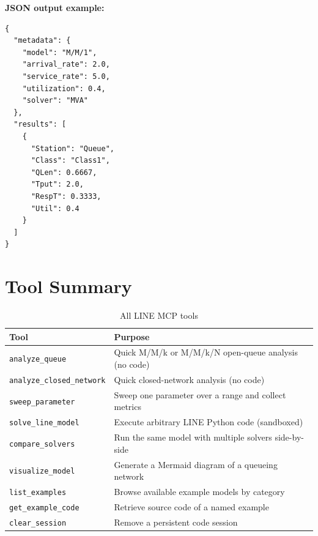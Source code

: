 \documentclass[11pt]{article}
\begin{document}
\noindent\textbf{JSON output example:}
\begin{lstlisting}[style=jsonstyle]
{
  "metadata": {
    "model": "M/M/1",
    "arrival_rate": 2.0,
    "service_rate": 5.0,
    "utilization": 0.4,
    "solver": "MVA"
  },
  "results": [
    {
      "Station": "Queue",
      "Class": "Class1",
      "QLen": 0.6667,
      "Tput": 2.0,
      "RespT": 0.3333,
      "Util": 0.4
    }
  ]
}
\end{lstlisting}

\section{Tool Summary}

\begin{table}[h]
\centering
\begin{tabularx}{\textwidth}{lX}
\toprule
\textbf{Tool} & \textbf{Purpose} \\
\midrule
\texttt{analyze\_queue} & Quick M/M/k or M/M/k/N open-queue analysis (no code) \\
\texttt{analyze\_closed\_network} & Quick closed-network analysis (no code) \\
\texttt{sweep\_parameter} & Sweep one parameter over a range and collect metrics \\
\texttt{solve\_line\_model} & Execute arbitrary LINE Python code (sandboxed) \\
\texttt{compare\_solvers} & Run the same model with multiple solvers side-by-side \\
\texttt{visualize\_model} & Generate a Mermaid diagram of a queueing network \\
\texttt{list\_examples} & Browse available example models by category \\
\texttt{get\_example\_code} & Retrieve source code of a named example \\
\texttt{clear\_session} & Remove a persistent code session \\
\bottomrule
\end{tabularx}
\caption{All LINE MCP tools}
\end{table}
\end{document}
